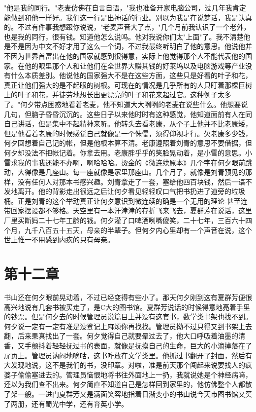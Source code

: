 \documentclass[UTF8]{ctexart}
\begin{document}
"他是我的同行。"老麦仿佛在自言自语，"我也准备开家电脑公司，过几年我肯定能做到和他一样好。我们这一行是出神话的行业。别以为我是在说梦话，我是认真的。不过有件事我想跟你说说，"老麦声音大了点，"几个月前我认识了一个老外，也是我的同行，很有钱。知道他怎么说吗。他对我说你们太"上面"了。我不清楚他是不是因为中文不好才用了这么一个词，不过我最终听明白了他的意思。他说他并不因为世界首富出在他的国家就感到很得意，实际上他觉得那个人不能代表他的国家。在他的眼里那个人和让他们在全世界大赚其钱的好莱坞以及电脑游戏等产业没有什么本质差别。他说他的国家强大不是在这些方面，这些只是好看的叶子和花，真正让他们强大的是不起眼的树根。可现在的情况是几乎所有的人只盯着那棵巨树上的叶子和花，并徒劳地想长出更漂亮的叶子和花来超过它。这种例子太多了。"何夕带点困惑地看着老麦，他不知道大大咧咧的老麦在说些什么。他想要说几句，但脑子昏昏沉沉的。这些日子以来他时时有这种感觉，他知道面前有人在同自己讲话，但是集中不起精神来听。他转头去看老康，从个子上他并不比老康矮，但是他看着老康的时候感觉自己就像是一个侏儒，须得仰视才行。欠老康多少钱，何夕回想着自己记的帐，但是他根本算不清。老康遵照着刘青的意思不要借据，但何夕却没法不把帐记着。你拿去用。老康胖乎乎的笑脸晃动着，是小雪的意思。小雪求我的事我还能不办啊，啊哈哈哈。烫金的《微连续原本》几个字在何夕眼前跳动，大得像是几座山。每一座就像是家里那座山。几个月了，就像是刘青预见的那样，没有任何人对那本书感兴趣。刘青拿走了一套，塞给他四百块钱，然后一语不发地离开。他的背影走出很远之后让何夕看见轻轻叹口气把书扔进了道旁的垃圾桶。正是刘青的这个举动真正让何夕意识到微连续的确是一个无用的理论-甚至连带回家摆设都不够格。天空里有一本汗津津的存折飞来飞去，夏群芳在说话，这里厂里买断妈二十七年工龄的钱。何夕灌了口啤酒咧嘴傻笑，二十七年，三百六十四个月，九千八百五十五天，母亲的半辈子。但何夕内心里却有一个声音在说，这个世上惟一不用感到内疚的只有母亲。

\clearpage

\section*{第十二章}

书山还在何夕眼前晃动着，不过已经变得有些小了。那天何夕刚到这有夏群芳便很高兴地说有几套书被买走了，是C大的图书馆。夏群芳说话的时候得意地亮着手里的钞票。但是何夕去的时候管理员说篇目上并没有这套书，数学类书架也找不到。何夕说一定有一定有准是没登记上麻烦你再找找。管理员拗不过只得又到书架上去翻，后来果真找出了一套。何夕觉得自己就要晕过去了，他大口呼吸着油墨的清香，又手颤抖着轻轻抚过书的表面，就像是抚摸自己的生命，巨大的小滴掉落在了扉页上。管理员讷闷地嘀咕，这书咋放在文学类里。他抓过书翻开了封面，然后有大发现地说，这不是我们的书，没印章。对啦，准是前天那个闯起来说要找人的疯婆子偷偷塞进去的。管理员恼恨地将书往外面地上一扔，我就说她是个神经病嘛，还以为我们查不出来。何夕简直不知道自己是怎样回到家里的，他仿佛整个人都散了架一般。一进门夏群芳又是满面笑容地指着日渐变小的书山说今天市图书馆又买了两册，还有蜀光中学，还有育英小学。
\end{document}
